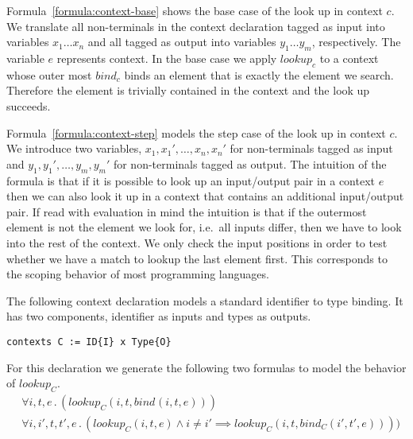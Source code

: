 Formula~\ref{formula:context-base} shows the base case of the look up
in context $c$. We translate all non-terminals in the context
declaration tagged as input into variables $x_1 \dots x_n$ and all
tagged as output into variables $y_1 \dots y_m$, respectively. The
variable $e$ represents context. In the base case we apply $lookup_c$
to a context whose outer most $bind_c$ binds an element that is
exactly the element we search. Therefore the element is trivially
contained in the context and the look up succeeds.

Formula~\ref{formula:context-step} models the step case of the look up
in context $c$. We introduce two variables, $x_1,x_1', \dots,
x_n,x_n'$ for non-terminals tagged as input and $y_1,y_1', \dots,
y_m,y_m'$ for non-terminals tagged as output. The intuition of the
formula is that if it is possible to look up an input/output pair in a
context $e$ then we can also look it up in a context that contains an
additional input/output pair. If read with evaluation in mind the
intuition is that if the outermost element is not the element we look
for, i.e.\ all inputs differ, then we have to look into the rest of
the context. We only check the input positions in order to test
whether we have a match to lookup the last element first. This
corresponds to the scoping behavior of most programming languages.

\begin{example}
  The following context declaration models a standard identifier to
  type binding. It has two components, identifier as inputs and types
  as outputs.
\begin{lstlisting}[language=sltc]
contexts C := ID{I} x Type{O}
\end{lstlisting}
  For this declaration we generate the following two formulas to model
  the behavior of $lookup_{C}$.
  \begin{align}
    &\forall i, t, e \,.\, (lookup_{C}(i, t, bind_{}(i, t,
    e))) \\
    &\forall i,i',t,t',e \,.\, (lookup_{C}(i, t, e) \land i \neq
    i' \implies lookup_{C}(i, t, bind_{C}(i', t', e))))
  \end{align}
\label{ex:context-formulas}
\end{example}

